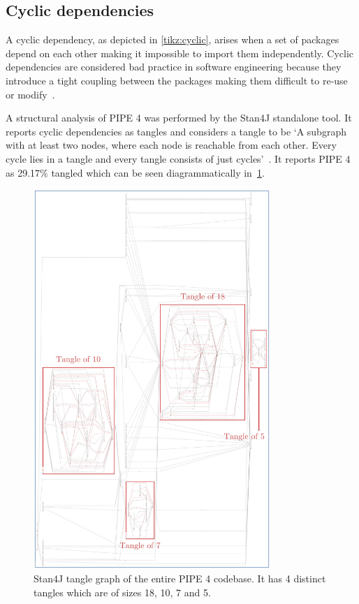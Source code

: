 \subsection{Cyclic dependencies}
A cyclic dependency, as depicted in \cref{tikz:cyclic}, arises when a set of packages depend on each other making it impossible to import them independently. Cyclic dependencies are considered bad practice in software engineering because they introduce a tight coupling between the packages making them difficult to re-use or modify~\cite{whats_wrong_with_circular_references}.



A structural analysis of PIPE 4 was performed by the Stan4J standalone tool. It reports cyclic dependencies as tangles and considers a tangle to be `A subgraph with at least two nodes, where each node is reachable from each other. Every cycle lies in a tangle and every tangle consists of just cycles'~\cite{stan_whitepaper}. It reports PIPE 4 as 29.17\% tangled which can be seen diagrammatically in~\cref{fig:tangle}.

\begin{figure}[tb]
\begin{center}
    \includegraphics[width=0.8\textwidth]{analysis/tangle_annotated.png} 
    \caption{Stan4J tangle graph of the entire PIPE 4 codebase. It has 4 distinct tangles which are of sizes 18, 10, 7 and 5.}
    \label{fig:tangle}
\end{center}
\end{figure}

% 

